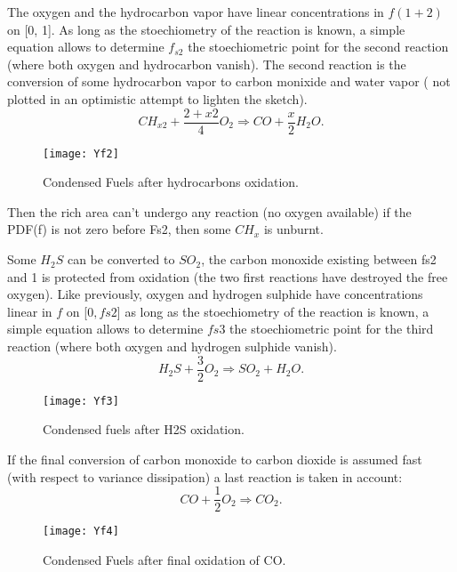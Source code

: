 The oxygen and the hydrocarbon vapor have linear concentrations in $f(1+2)$ on [0,
1]. As long as the stoechiometry of the reaction is known, a simple equation
allows to determine $f_{s2}$ the stoechiometric point for the second reaction
({\small where both oxygen and hydrocarbon vanish}). The second reaction is the
conversion of some hydrocarbon vapor to carbon monixide and water vapor ({\small
  not plotted in an optimistic attempt to lighten the sketch}).
\begin{equation*}
CH_{x2} + \displaystyle \frac{2+x2}{4} O_{2} \Rightarrow CO + \frac{x}{2} H_{2}O.
\end{equation*}
\begin{figure}[!htpb]
\centerline{\texttt{[image: Yf2]}}
\caption{Condensed Fuels after hydrocarbons oxidation.}
\end{figure}

Then the rich area can't undergo any reaction (no oxygen available) if the PDF(f) is not zero before Fs2, then some $CH_{x}$ is unburnt.

Some $H_{2}S$ can be converted to $SO_{2}$, the carbon monoxide existing between
fs2 and 1 is protected from oxidation (the two first reactions have destroyed
the free oxygen). Like previously, oxygen and hydrogen sulphide have
concentrations linear in $f$ on [$0,fs2$] as long as the stoechiometry of the
reaction is known, a simple equation allows to determine $fs3$ the stoechiometric
point for the third reaction (where both oxygen and hydrogen sulphide vanish).
\begin{equation*}
H_{2}S + \dfrac{3}{2} O_{2} \Rightarrow SO_{2} + H_{2}O .
\end{equation*}
\begin{figure}[!htpb]
\centerline{\texttt{[image: Yf3]}}
\caption{Condensed fuels after H2S oxidation.}
\end{figure}

If the final conversion of carbon monoxide to carbon dioxide is assumed fast
(with respect to variance dissipation) a last reaction is taken in account:
\begin{equation*}
CO + \dfrac{1}{2} O_{2} \Rightarrow CO_{2}.
\end{equation*}
\begin{figure}[!htpb]
\centerline{\texttt{[image: Yf4]}}
\caption{Condensed Fuels after final oxidation of CO.}
\end{figure}

